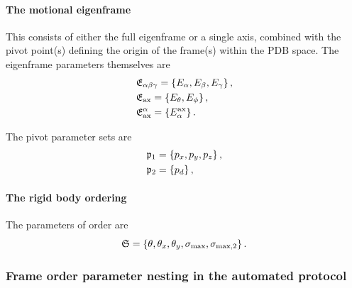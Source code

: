 \paragraph{The motional eigenframe}

This consists of either the full eigenframe or a single axis, combined with the pivot point(s) defining the origin of the frame(s) within the PDB space.
The eigenframe parameters themselves are
\begin{subequations}
\begin{align}
    &\mathfrak{E}_{\alpha\beta\gamma} = \left\{ E_\alpha, E_\beta, E_\gamma \right\}, \\
    &\mathfrak{E}_{\textrm{ax}} = \left\{ E_\theta, E_\phi \right\}, \\
    &\mathfrak{E}^\alpha_{\textrm{ax}} = \left\{ E_\alpha^{\textrm{ax}} \right\}.
\end{align}
\end{subequations}

The pivot parameter sets are
\begin{subequations}
\begin{align}
    &\mathfrak{p}_1 = \left\{ p_x, p_y, p_z \right\}, \\
    &\mathfrak{p}_2 = \left\{ p_d \right\},
\end{align}
\end{subequations}


\paragraph{The rigid body ordering}

The parameters of order are
\begin{equation}
    \mathfrak{S} = \left\{ \theta, \theta_x, \theta_y, \sigma_{\textrm{max}}, \sigma_{\textrm{max,2}} \right\}.
\end{equation}


\subsubsection{Frame order parameter nesting in the automated protocol}

